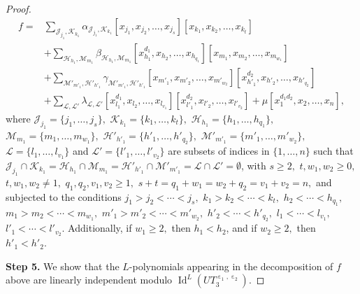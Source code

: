 \documentclass[a4paper,reqno]{amsart}
\theoremstyle{definition}
\numberwithin{equation}{section}
\numberwithin{theorem}{section}
\DeclareMathOperator{\I}{Id}
\DeclareMathOperator{\e}{\varepsilon}
\begin{document}
\begin{proof}
 \begin{align*}
    f = &\sum_{\mathcal{J}_{j_1}, \mathcal{K}_{k_1}} \alpha_{ \mathcal{J}_{j_1}, \mathcal{K}_{k_1}} [x_{j_1},x_{j_2},\dots,x_{j_s}][x_{k_1},x_{k_2},\dots,x_{k_t}]\\
    &+ \sum_{ \mathcal{H}_{h_1}, \mathcal{M}_{m_1}}  \beta_{\mathcal{H}_{h_1}, \mathcal{M}_{m_1}} [x_{h_1}^{d_1},x_{h_2},\dots,x_{h_{q_1}}][x_{m_1},x_{m_2},\dots,x_{m_{w_1}}]\\
    &+ \sum_{ \mathcal{M}'_{m'_1}, \mathcal{H}'_{h'_1}}  \gamma_{ \mathcal{M}'_{m'_1}, \mathcal{H}'_{h'_1}}[x_{m'_1},x_{m'_2},\dots,x_{m'_{w_2}}][x_{h'_1}^{d_2},x_{h'_2},\dots,x_{h'_{q_2}}]\\
    &+ \sum_{\mathcal{L}, \mathcal{L}'}  \lambda_{\mathcal{L}, \mathcal{L}'}[x_{l_1}^{d_1},x_{l_2},\dots,x_{l_{v_1}}][x_{l'_1}^{d_2},x_{l'_2},\dots,x_{l'_{v_2}}]+  \mu[x_{1}^{d_1 d_2},x_{2},\dots,x_{n}],
\end{align*}
where $\mathcal{J}_{j_1}=\{j_1,\ldots,j_s\},$ $\mathcal{K}_{k_1}=\{k_1,\ldots,k_t\},$ $\mathcal{H}_{h_1}=\{h_1,\ldots,h_{q_1}\},$ $\mathcal{M}_{m_1}=\{m_1,\ldots,m_{w_1}\},$ $\mathcal{H}'_{h'_1}=\{h'_1,\ldots,h'_{q_2}\},$ $\mathcal{M}'_{m'_1}=\{m'_1,\ldots,m'_{w_2}\},$ $\mathcal{L}=\{l_1,\ldots,l_{v_1}\}$ and $\mathcal{L}'=\{l'_1,\ldots,l'_{v_2}\}$
 are subsets of indices in $\{1,\ldots, n\}$ such that $\mathcal{J}_{j_1}\cap \mathcal{K}_{k_1}=\mathcal{H}_{h_1}\cap \mathcal{M}_{m_1}=\mathcal{H}'_{h'_1}\cap \mathcal{M}'_{m'_1}=\mathcal{L}\cap \mathcal{L}'=\emptyset$, with
$s\geq 2,$ $t, w_1,w_2\geq 0,$ $t,w_1,w_2\neq 1,$ $q_1,q_2,v_1,v_2\geq 1,$ $s+t=q_1+w_1=w_2+q_2=v_1+v_2=n,$ and subjected  to the conditions $j_1>j_2<  \cdots < j_s,$ $k_1>k_2<  \cdots < k_t,$ $h_2< \cdots <h_{q_1},$ $m_1> m_2< \cdots < m_{w_1},$ $m'_1> m'_2< \cdots < m'_{w_2},$ $h'_2< \cdots <h'_{q_2},$ $l_1< \cdots < l_{v_1},$ $l'_1< \cdots < l'_{v_2}$. Additionally, if $w_1\geq 2,$ then $h_1< h_2$, and  if $w_2\geq 2,$ then $h'_1< h'_2.$

\textbf{Step 5.} We show that the $L$-polynomials appearing in the decomposition of $f$ above are
linearly independent modulo $\I^L(UT_3^{\e_1,\e_2})$.



\end{proof}
\end{document}
